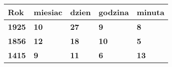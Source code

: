 \begin{table}[]
\begin{tabular}{|l|l|l|l|l|}
\hline
\textbf{Rok} & \textbf{miesiac} & \textbf{dzien} & \textbf{godzina} & \textbf{minuta} \\ \hline
\textbf{1925}    & \textbf{10} & \textbf{27} & \textbf{9} & \textbf{8} \\ \hline
\textbf{1856}    & \textbf{12} & \textbf{18} & \textbf{10} & \textbf{5} \\ \hline
\textbf{1415}    & \textbf{9} & \textbf{11} & \textbf{6} & \textbf{13} \\ \hline
\end{tabular}

\label{tab:przemek}

\end{table}